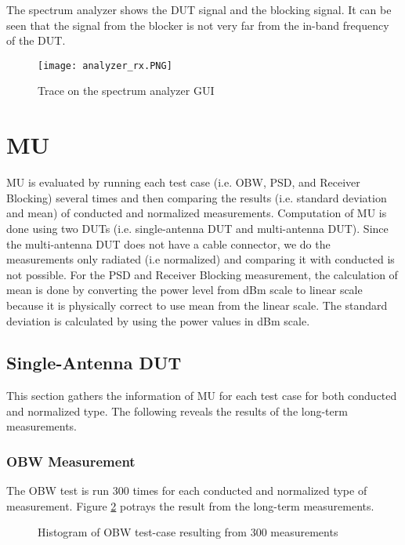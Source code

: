 The spectrum analyzer shows the DUT signal and the blocking signal. It can be seen that the signal from the blocker is not very far from the in-band frequency of the \acs{DUT}.
\begin{figure}[H]
\centering
\texttt{[image: analyzer\_rx.PNG]}
\caption{Trace on the spectrum analyzer \acs{GUI}}
\label{fig:ax} 
\end{figure}


\section{\acf{MU}}
\acf{MU} is evaluated by running each test case (i.e. \acf{OBW}, \acf{PSD}, and Receiver Blocking) several times and then comparing the results (i.e. standard deviation and mean) of conducted and normalized measurements. Computation of \acs{MU} is done using two \acsp{DUT} (i.e. single-antenna \acs{DUT} and multi-antenna \acs{DUT}). Since the multi-antenna \acs{DUT} does not have a cable connector, we do the measurements only radiated (i.e normalized) and comparing it with conducted is not possible. For the \acs{PSD} and Receiver Blocking measurement, the calculation of mean is done by converting the power level from dBm scale to linear scale because it is physically correct to use mean from the linear scale. The standard deviation is calculated by using the power values in dBm scale. 

\subsection{Single-Antenna \acs{DUT}}
This section gathers the information of \acf{MU} for each test case for both conducted and normalized type. The following reveals the results of the long-term measurements.

\subsubsection{\acf{OBW} Measurement}
The \acs{OBW} test is run 300 times for each conducted and normalized type of measurement. Figure \ref{fig:otavscond} potrays the result from the long-term measurements.

\begin{figure}[H]
\centering
{} 
\caption{Histogram of \acs{OBW} test-case resulting from 300 measurements }
\label{fig:otavscond} 
\end{figure}

